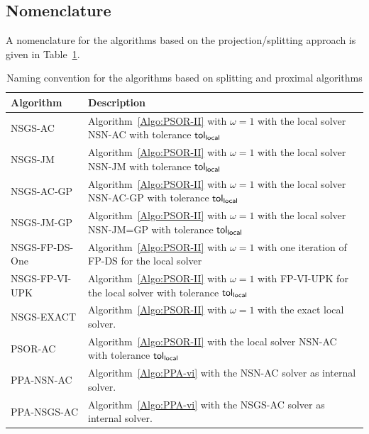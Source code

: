 \subsection{Nomenclature}
A nomenclature for the algorithms based on the projection/splitting approach is given in Table~\ref{tab:PSOR-PPA-algos}.

\begin{table}
  \centering
  \begin{tabular}{|l|p{}|}
    \hline
    { Algorithm}
    & Description 
    \\
    \hline
    \sf NSGS-AC
    & Algorithm~\ref{Algo:PSOR-II} with $\omega=1$ with the local solver NSN-AC with tolerance $\sf tol_{local}$
    \\
    \hline
    \sf NSGS-JM
    & Algorithm~\ref{Algo:PSOR-II} with $\omega=1$ with the local solver NSN-JM with tolerance $\sf tol_{local}$
    \\
    \hline
    \sf NSGS-AC-GP
    & Algorithm~\ref{Algo:PSOR-II} with $\omega=1$ with the local solver NSN-AC-GP with tolerance $\sf tol_{local}$
    \\
    \hline
    \sf NSGS-JM-GP
    & Algorithm~\ref{Algo:PSOR-II} with $\omega=1$ with the local solver NSN-JM=GP with tolerance $\sf tol_{local}$
    \\
    \hline
    \sf NSGS-FP-DS-One
    & Algorithm~\ref{Algo:PSOR-II} with $\omega=1$ with one iteration of FP-DS for the local solver
    \\
    \hline
    \sf NSGS-FP-VI-UPK
    & Algorithm~\ref{Algo:PSOR-II} with $\omega=1$ with FP-VI-UPK for the local solver with tolerance $\sf tol_{local}$
    \\
    \hline
    \sf NSGS-EXACT
    & Algorithm~\ref{Algo:PSOR-II} with $\omega=1$ with the exact local solver.
    \\
    \hline
    \hline
    \sf PSOR-AC 
    &  Algorithm~\ref{Algo:PSOR-II} with the local solver NSN-AC with tolerance $\sf tol_{local}$
    \\
    \hline
    \hline
    \sf PPA-NSN-AC 
    &  Algorithm~\ref{Algo:PPA-vi} with the NSN-AC solver as internal solver.
    \\
    \hline
    \sf PPA-NSGS-AC
    &  Algorithm~\ref{Algo:PPA-vi} with the NSGS-AC solver as internal solver.
    \\
    \hline
  \end{tabular}
  \caption{Naming convention for the algorithms based on splitting and proximal algorithms}
  \label{tab:PSOR-PPA-algos}
\end{table}

